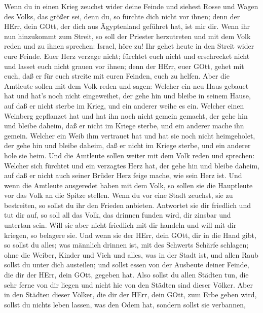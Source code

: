  Wenn du in einen Krieg zeuchst wider deine Feinde und
siehest Rosse und Wagen des Volks, das größer sei, denn du, so fürchte
dich nicht vor ihnen; denn der HErr, dein GOtt, der dich aus Ägyptenland
geführet hat, ist mir dir.  Wenn ihr nun hinzukommt zum
Streit, so soll der Priester herzutreten und mit dem Volk reden
 und zu ihnen sprechen: Israel, höre zu! Ihr gehet heute in
den Streit wider eure Feinde. Euer Herz verzage nicht; fürchtet euch
nicht und erschrecket nicht und lasset euch nicht grauen vor ihnen;
 denn der HErr, euer GOtt, gehet mit euch, daß er für euch
streite mit euren Feinden, euch zu helfen.  Aber die
Amtleute sollen mit dem Volk reden und sagen: Welcher ein neu Haus
gebauet hat und hat's noch nicht eingeweihet, der gehe hin und bleibe in
seinem Hause, auf daß er nicht sterbe im Krieg, und ein anderer weihe es
ein.  Welcher einen Weinberg gepflanzet hat und hat ihn noch
nicht gemein gemacht, der gehe hin und bleibe daheim, daß er nicht im
Kriege sterbe, und ein anderer mache ihn gemein.  Welcher
ein Weib ihm vertrauet hat und hat sie noch nicht heimgeholet, der gehe
hin und bleibe daheim, daß er nicht im Kriege sterbe, und ein anderer
hole sie heim.  Und die Amtleute sollen weiter mit dem Volk
reden und sprechen: Welcher sich fürchtet und ein verzagtes Herz hat,
der gehe hin und bleibe daheim, auf daß er nicht auch seiner Brüder Herz
feige mache, wie sein Herz ist.  Und wenn die Amtleute
ausgeredet haben mit dem Volk, so sollen sie die Hauptleute vor das Volk
an die Spitze stellen.  Wenn du vor eine Stadt zeuchst, sie
zu bestreiten, so sollst du ihr den Frieden anbieten. 
Antwortet sie dir friedlich und tut dir auf, so soll all das Volk, das
drinnen funden wird, dir zinsbar und untertan sein.  Will
sie aber nicht friedlich mit dir handeln und will mit dir kriegen, so
belagere sie.  Und wenn sie der HErr, dein GOtt, dir in die
Hand gibt, so sollst du alles; was männlich drinnen ist, mit des
Schwerts Schärfe schlagen;  ohne die Weiber, Kinder und
Vieh und alles, was in der Stadt ist, und allen Raub sollst du unter
dich austeilen; und sollst essen von der Ausbeute deiner Feinde, die dir
der HErr, dein GOtt, gegeben hat.  Also sollst du allen
Städten tun, die sehr ferne von dir liegen und nicht hie von den Städten
sind dieser Völker.  Aber in den Städten dieser Völker, die
dir der HErr, dein GOtt, zum Erbe geben wird, sollst du nichts leben
lassen, was den Odem hat,  sondern sollst sie verbannen,
